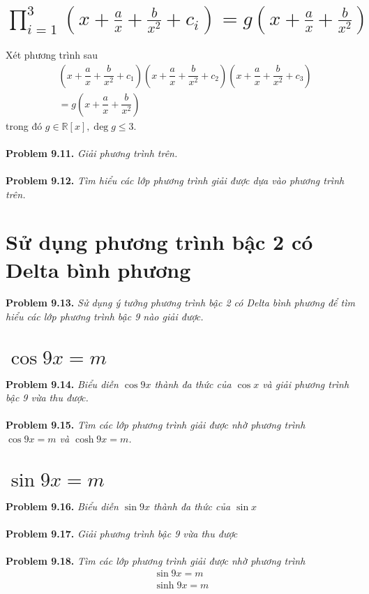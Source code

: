 \documentclass[a4paper,oneside]{book}
\numberwithin{equation}{chapter}
\begin{document}
\section{$\prod\limits_{i = 1}^3 {\left( {x + \frac{a}{x} + \frac{b}{{{x^2}}} + {c_i}} \right)}  = g\left( {x + \frac{a}{x} + \frac{b}{{{x^2}}}} \right)$}
Xét phương trình sau
\begin{align}
&\left( {x + \dfrac{a}{x} + \dfrac{b}{{{x^2}}} + {c_1}} \right)\left( {x + \dfrac{a}{x} + \dfrac{b}{{{x^2}}} + {c_2}} \right)\left( {x + \dfrac{a}{x} + \dfrac{b}{{{x^2}}} + {c_3}} \right) \\
&= g\left( {x + \dfrac{a}{x} + \dfrac{b}{{{x^2}}}} \right)
\end{align}
trong đó $g \in \mathbb{R} \left[ x \right],\deg g \le 3$.\\
\\
\textbf{Problem 9.11.} \textit{Giải phương trình trên.}\\
\\
\textbf{Problem 9.12.} \textit{Tìm hiểu các lớp phương trình giải được dựa vào phương trình trên.}
\section{Sử dụng phương trình bậc 2 có Delta bình phương}
\textbf{Problem 9.13.} \textit{Sử dụng ý tưởng phương trình bậc 2 có Delta bình phương để tìm hiểu các lớp phương trình bậc 9 nào giải được.}
\section{$\cos 9x = m$}
\textbf{Problem 9.14.} \textit{Biểu diễn $\cos 9x$ thành đa thức của $\cos x$ và giải phương trình bậc 9 vừa thu được.}\\
\\
\textbf{Problem 9.15.} \textit{Tìm các lớp phương trình giải được nhờ phương trình $\cos 9x = m$ và $\cosh 9x = m$.}
\section{$\sin 9x = m$}
\textbf{Problem 9.16.} \textit{Biểu diễn $\sin 9x$ thành đa thức của $\sin x$}\\
\\
\textbf{Problem 9.17.} \textit{Giải phương trình bậc 9 vừa thu được}\\
\\
\textbf{Problem 9.18.} \textit{Tìm các lớp phương trình giải được nhờ phương trình}
\begin{align}
\sin 9x = m\\
\sinh 9x = m
\end{align}
\end{document}
